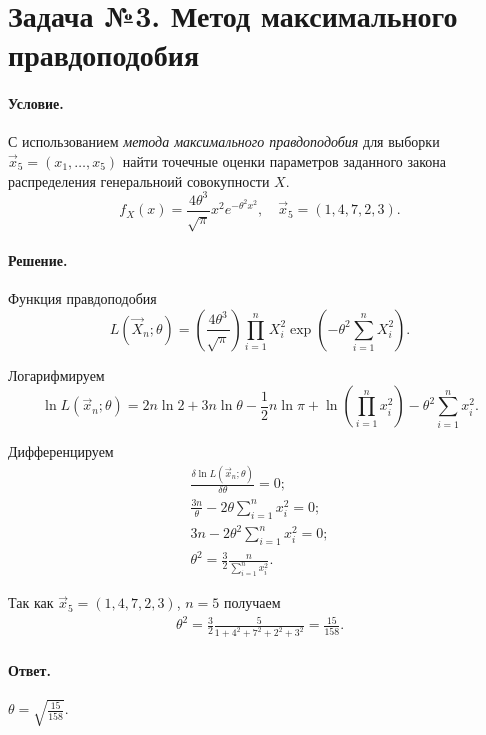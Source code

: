 
\section{Задача №3. Метод максимального правдоподобия}

\paragraph{Условие.} С использованием \emph{метода максимального правдоподобия} для выборки $\vec{x}_5 = (x_1, \dots, x_5)$ найти точечные оценки параметров заданного закона распределения генеральноий совокупности $X$.
\[
    f_X(x) = \frac{4\theta^3}{\sqrt{\pi}} x^2 e^{-\theta^2 x^2}, \quad \vec{x}_5 = (1, 4, 7, 2, 3).
\]

\paragraph{Решение.}

\noindent
Функция правдоподобия
\[
    L(\vec{X}_n; \theta) = \left( \frac{4 \theta^3}{\sqrt{\pi}} \right) \prod_{i = 1}^{n} X_i^2 \exp \left( - \theta^2 \sum_{i = 1}^n X_i^2 \right).
\]

\noindent
Логарифмируем
\[
    \ln L(\vec{x}_n; \theta) = 2n \ln 2 + 3n \ln \theta - \frac{1}{2} n \ln\pi + \ln\left( \prod_{i = 1}^{n} x_i^2 \right) - \theta^2 \sum_{i = 1}^n x_i^2.
\]

\noindent
Дифференцируем
\begin{align*}
    \frac{\delta\ln L(\vec{x}_n; \theta)}{\delta\theta} = 0;
    \\
    \frac{3n}{\theta} - 2 \theta \sum_{i = 1}^n x_i^2 = 0;
    \\
    3n - 2\theta^2\sum_{i = 1}^n x_i^2 = 0;
    \\
    \theta^2 = \frac{3}{2}\frac{n}{\sum_{i = 1}^n x_i^2}.
\end{align*}

\noindent
Так как $\vec{x}_5 = (1, 4, 7, 2, 3)$, $n = 5$ получаем
\begin{align}
    \theta^2 = \frac{3}{2} \frac{5}{1 + 4^2 + 7^2 + 2^2 + 3^2} = \frac{15}{158}.
\end{align}

\paragraph{Ответ.} $\displaystyle\theta = \sqrt{\frac{15}{158}}$.